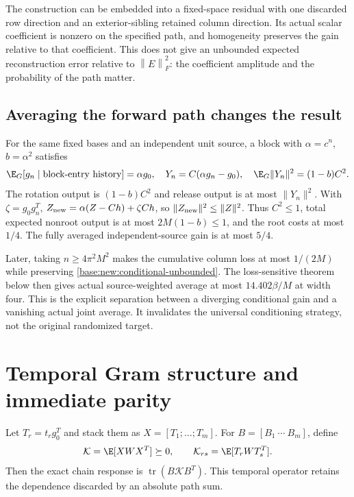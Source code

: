 \documentclass[11pt,oneside,openany,a4paper]{book}
\numberwithin{equation}{chapter}
\theoremstyle{definition}
\theoremstyle{remark}
\newcommand{\F}[1]{\left\lVert#1\right\rVert_F}
\DeclareMathOperator{\tr}{tr}\DeclareMathOperator{\rank}{rank}
\begin{document}
The construction can be embedded into a fixed-space residual with one discarded row direction and an exterior-sibling retained column direction. Its actual scalar coefficient is nonzero on the specified path, and homogeneity preserves the gain relative to that coefficient. This does not give an unbounded expected reconstruction error relative to $\F E^2$: the coefficient amplitude and the probability of the path matter.

\subsection{Averaging the forward path changes the result}
For the same fixed bases and an independent unit source, a block with $\alpha=c^n$, $b=\alpha^2$ satisfies
\[
 \E_G[g_n\mid\text{block-entry history}]=\alpha g_0,\quad
 Y_n=C(\alpha g_n-g_0),\quad
 \E_G\|Y_n\|^2=(1-b)C^2.
\]
The rotation output is $(1-b)C^2$ and release output is at most $\|Y_n\|^2$. With $\zeta=g_0g_n^T$,
$Z_{\rm new}=\alpha(Z-Ch)+\zeta Ch$, so $\|Z_{\rm new}\|^2\le\|Z\|^2$. Thus $C^2\le1$, total expected nonroot output is at most $2M(1-b)\le1$, and the root costs at most $1/4$. The fully averaged independent-source gain is at most $5/4$.

Later, taking $n\ge4\pi^2M^2$ makes the cumulative column loss at most $1/(2M)$ while preserving \eqref{base:new:conditional-unbounded}. The loss-sensitive theorem below then gives actual source-weighted average at most $14.402\beta/M$ at width four. This is the explicit separation between a diverging conditional gain and a vanishing actual joint average. It invalidates the universal conditioning strategy, not the original randomized target.

\section{Temporal Gram structure and immediate parity}\label{base:new:temporal}
Let $T_r=t_rg_0^T$ and stack them as $X=[T_1;\ldots;T_m]$. For $B=[B_1\ \cdots\ B_m]$, define
\[
 \mathcal K=\E[XWX^T]\succeq0,\qquad
 \mathcal K_{rs}=\E[T_rWT_s^T].
\]
Then the exact chain response is $\tr(B\mathcal K B^T)$. This temporal operator retains the dependence discarded by an absolute path sum.
\end{document}
